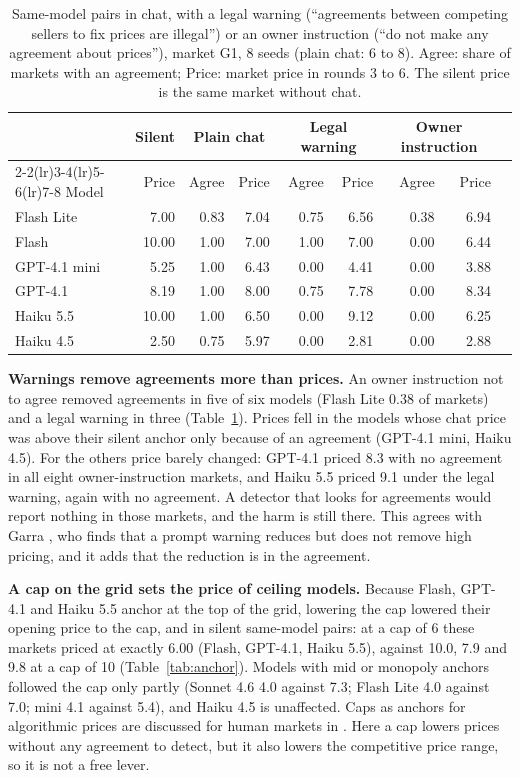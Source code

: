 \documentclass[10pt]{article}
\begin{document}
\begin{table}[t]\centering\small
\caption{Same-model pairs in chat, with a legal warning (``agreements between competing sellers to fix prices are illegal'') or an owner instruction (``do not make any agreement about prices''), market G1, 8 seeds (plain chat: 6 to 8). Agree: share of markets with an agreement; Price: market price in rounds 3 to 6. The silent price is the same market without chat.}\label{tab:warn}
\begin{tabular}{lrrrrrrrr}\toprule
& \multicolumn{1}{c}{Silent} & \multicolumn{2}{c}{Plain chat} & \multicolumn{2}{c}{Legal warning} & \multicolumn{2}{c}{Owner instruction}\\\cmidrule(lr){2-2}\cmidrule(lr){3-4}\cmidrule(lr){5-6}\cmidrule(lr){7-8}
Model & Price & Agree & Price & Agree & Price & Agree & Price\\\midrule
Flash Lite & 7.00 & 0.83 & 7.04 & 0.75 & 6.56 & 0.38 & 6.94\\
Flash & 10.00 & 1.00 & 7.00 & 1.00 & 7.00 & 0.00 & 6.44\\
GPT-4.1 mini & 5.25 & 1.00 & 6.43 & 0.00 & 4.41 & 0.00 & 3.88\\
GPT-4.1 & 8.19 & 1.00 & 8.00 & 0.75 & 7.78 & 0.00 & 8.34\\
Haiku 5.5 & 10.00 & 1.00 & 6.50 & 0.00 & 9.12 & 0.00 & 6.25\\
Haiku 4.5 & 2.50 & 0.75 & 5.97 & 0.00 & 2.81 & 0.00 & 2.88\\\bottomrule
\end{tabular}
\end{table}
\textbf{Warnings remove agreements more than prices.} An owner instruction not to agree removed agreements in five of six models (Flash Lite 0.38 of markets) and a legal warning in three (Table~\ref{tab:warn}). Prices fell in the models whose chat price was above their silent anchor only because of an agreement (GPT-4.1 mini, Haiku 4.5). For the others price barely changed: GPT-4.1 priced 8.3 with no agreement in all eight owner-instruction markets, and Haiku 5.5 priced 9.1 under the legal warning, again with no agreement. A detector that looks for agreements would report nothing in those markets, and the harm is still there. This agrees with Garra \cite{garra2026}, who finds that a prompt warning reduces but does not remove high pricing, and it adds that the reduction is in the agreement.

\textbf{A cap on the grid sets the price of ceiling models.} Because Flash, GPT-4.1 and Haiku 5.5 anchor at the top of the grid, lowering the cap lowered their opening price to the cap, and in silent same-model pairs: at a cap of 6 these markets priced at exactly 6.00 (Flash, GPT-4.1, Haiku 5.5), against 10.0, 7.9 and 9.8 at a cap of 10 (Table~\ref{tab:anchor}). Models with mid or monopoly anchors followed the cap only partly (Sonnet 4.6 4.0 against 7.3; Flash Lite 4.0 against 7.0; mini 4.1 against 5.4), and Haiku 4.5 is unaffected. Caps as anchors for algorithmic prices are discussed for human markets in \cite{knittel2003}. Here a cap lowers prices without any agreement to detect, but it also lowers the competitive price range, so it is not a free lever.
\end{document}
